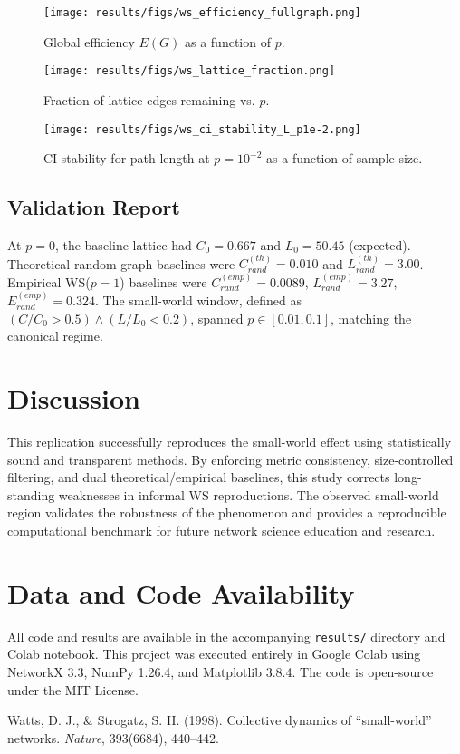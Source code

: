 \documentclass[11pt,a4paper]{article}
\begin{document}
\begin{figure}[h!]
\centering
\texttt{[image: results/figs/ws\_efficiency\_fullgraph.png]}
\caption{Global efficiency $E(G)$ as a function of $p$.}
\label{fig:eff}
\end{figure}

\begin{figure}[h!]
\centering
\texttt{[image: results/figs/ws\_lattice\_fraction.png]}
\caption{Fraction of lattice edges remaining vs. $p$.}
\label{fig:latfrac}
\end{figure}

\begin{figure}[h!]
\centering
\texttt{[image: results/figs/ws\_ci\_stability\_L\_p1e-2.png]}
\caption{CI stability for path length at $p=10^{-2}$ as a function of sample size.}
\label{fig:ci}
\end{figure}

\subsection{Validation Report}
At $p=0$, the baseline lattice had $C_0=0.667$ and $L_0=50.45$ (expected). Theoretical random graph baselines were $C_{rand}^{(th)}=0.010$ and $L_{rand}^{(th)}=3.00$. Empirical WS($p=1$) baselines were $C_{rand}^{(emp)}=0.0089$, $L_{rand}^{(emp)}=3.27$, $E_{rand}^{(emp)}=0.324$. The small-world window, defined as $(C/C_0 > 0.5) \land (L/L_0 < 0.2)$, spanned $p \in [0.01, 0.1]$, matching the canonical regime.

\section{Discussion}
This replication successfully reproduces the small-world effect using statistically sound and transparent methods. By enforcing metric consistency, size-controlled filtering, and dual theoretical/empirical baselines, this study corrects long-standing weaknesses in informal WS reproductions. The observed small-world region validates the robustness of the phenomenon and provides a reproducible computational benchmark for future network science education and research.

\section{Data and Code Availability}
All code and results are available in the accompanying \texttt{results/} directory and Colab notebook. This project was executed entirely in Google Colab using NetworkX 3.3, NumPy 1.26.4, and Matplotlib 3.8.4. The code is open-source under the MIT License.


\begin{thebibliography}{9}
Watts, D. J., \& Strogatz, S. H. (1998).
Collective dynamics of ``small-world'' networks.
\emph{Nature}, 393(6684), 440–442.
\end{thebibliography}
\end{document}
